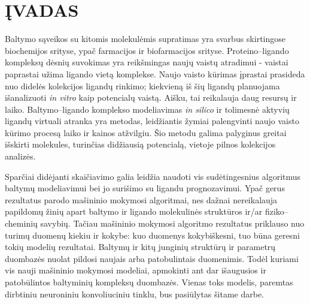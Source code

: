 
\usepackage{newtxmath}
\usepackage[style=dutch]{csquotes}
\newcommand{\angstrom}{\textup{\AA}}
\def\UrlBreaks{\do\/\do-}






\tableofcontents
\pagebreak


\section*{ĮVADAS}

Baltymo sąveikos su kitomis molekulėmis supratimas yra svarbus skirtingose biochemijos srityse, ypač farmacijos ir biofarmacijos srityse.\cite{hochuli_visualizing_2018}\cite{sethi_molecular_2019} Proteino--ligando kompleksų dėsnių suvokimas yra reikšmingas naujų vaistų atradimui - vaistai paprastai užima ligando vietą komplekse. Naujo vaisto kūrimas įprastai prasideda nuo didelės kolekcijos ligandų rinkimo; kiekvieną iš šių ligandų planuojama išanalizuoti \textit{in vitro} kaip potencialų vaistą. Aišku, tai reikalauja daug resursų ir laiko. Baltymo--ligando komplekso modeliavimas \textit{in silico} ir tolimesnė aktyvių ligandų virtuali atranka yra metodas, leidžiantis žymiai palengvinti naujo vaisto kūrimo procesą laiko ir kainos atžvilgiu. Šio metodu galima palyginus greitai išskirti molekules, turinčias didžiausią potencialą, vietoje pilnos kolekcijos analizės. \cite{berry_practical_2015}\cite{sethi_molecular_2019}

Sparčiai didėjanti skaičiavimo galia leidžia naudoti vis sudėtingesnius algoritmus baltymų modeliavimui bei jo surišimo su ligandu prognozavimui. Ypač gerus rezultatus parodo mašininio mokymosi algoritmai, nes dažnai nereikalauja papildomų žinių apart baltymo ir ligando molekulinės struktūros ir/ar fiziko--cheminių savybių. Tačiau mašininio mokymosi algoritmo rezultatus priklauso nuo turimų duomenų kiekiu ir kokybe: kuo duomenys kokybiškesni, tuo būna geresni tokių modelių rezultatai. Baltymų ir kitų junginių struktūrų ir parametrų duombazės nuolat pildosi naujais arba patobulintais duomenimis. Todėl kuriami vis nauji mašininio mokymosi modeliai, apmokinti ant dar išaugusios ir patobūlintos baltyminių kompleksų duombazės.\cite{meng_molecular_2011} Vienas toks modelis, paremtas dirbtiniu neuroniniu konvoliuciniu tinklu, bus pasiūlytas šitame darbe.

